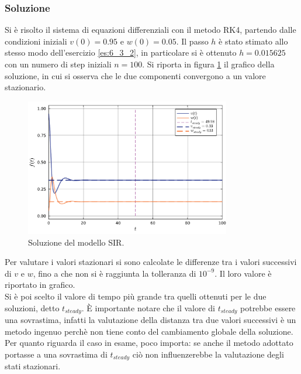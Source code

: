 \documentclass[letterpaper, 12pt]{article}
\numberwithin{equation}{section}    %
\begin{document}
\subsubsection{Soluzione}
Si è risolto il sistema di equazioni differenziali con il metodo RK4, partendo dalle condizioni iniziali
$v(0) = 0.95$ e $w(0) = 0.05$. Il passo $h$ è stato stimato allo stesso modo dell'esercizio \ref{es:6_3_2}, in 
particolare si è ottenuto $h = 0.015625$ con un numero di step iniziali $n = 100$. Si riporta in figura
\ref{fig:es6_3_3} il grafico della soluzione, in cui si osserva che le due componenti 
convergono a un valore stazionario. \\
\begin{figure}
    \centering
    \includegraphics[width=0.8\textwidth]{6331.pdf}
    \caption{Soluzione del modello SIR.}
    \label{fig:es6_3_3}
\end{figure}
Per valutare i valori stazionari si sono calcolate le differenze
tra i valori successivi di $v$ e $w$, fino a che non si è raggiunta la tolleranza di $10^{-9}$. Il 
loro valore è riportato in grafico. \\
Si è poi scelto il valore di tempo più grande tra quelli ottenuti per le due soluzioni, detto
$t_{steady}$. È importante notare che il valore di $t_{steady}$ potrebbe essere una sovrastima, 
infatti la valutazione della distanza
tra due valori successivi è un metodo ingenuo perchè non tiene conto del cambiamento globale 
della soluzione. Per quanto riguarda il caso in esame, poco importa: se anche il metodo adottato portasse a 
una sovrastima di $t_{steady}$ ciò non influenzerebbe 
la valutazione degli stati stazionari. 
\end{document}
